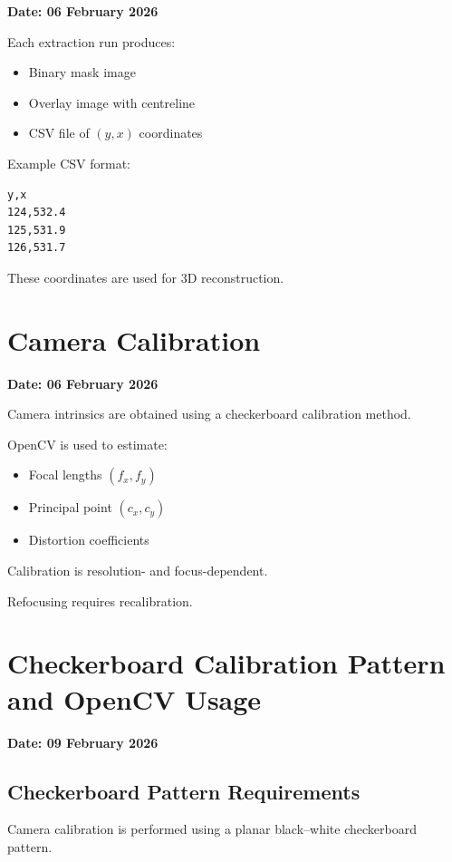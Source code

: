 \documentclass[11pt,a4paper]{article}
\begin{document}
\textbf{Date: 06 February 2026}

Each extraction run produces:

\begin{itemize}
  \item Binary mask image
  \item Overlay image with centreline
  \item CSV file of $(y,x)$ coordinates
\end{itemize}

Example CSV format:

\begin{lstlisting}
y,x
124,532.4
125,531.9
126,531.7
\end{lstlisting}

These coordinates are used for 3D reconstruction.

\section{Camera Calibration}

\textbf{Date: 06 February 2026}

Camera intrinsics are obtained using a checkerboard calibration method.

OpenCV is used to estimate:

\begin{itemize}
  \item Focal lengths $(f_x, f_y)$
  \item Principal point $(c_x, c_y)$
  \item Distortion coefficients
\end{itemize}

Calibration is resolution- and focus-dependent.

Refocusing requires recalibration.

\section{Checkerboard Calibration Pattern and OpenCV Usage}

\textbf{Date: 09 February 2026}

\subsection{Checkerboard Pattern Requirements}

Camera calibration is performed using a planar black--white checkerboard pattern.
\end{document}
